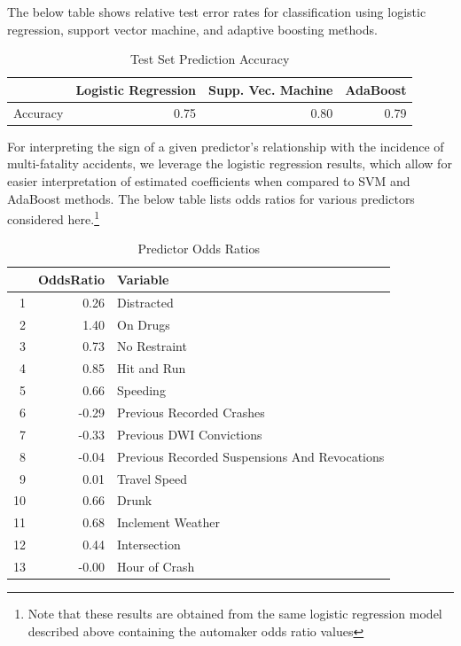 \documentclass[11pt, oneside,titlepage]{article}   	%
\begin{document}
The below table shows relative test error rates for classification using logistic regression, support vector machine, and adaptive boosting methods. \\

\begin{table}[ht]
\centering
\begin{tabular}{rrrr}
  \hline
 & Logistic Regression & Supp. Vec. Machine & AdaBoost \\ 
  \hline
Accuracy & 0.75 & 0.80 & 0.79 \\ 
   \hline
\end{tabular}
\caption{Test Set Prediction Accuracy} 
\end{table}

For interpreting the sign of a given predictor's relationship with the incidence of multi-fatality accidents, we leverage the logistic regression results, which allow for easier interpretation of estimated coefficients when compared to SVM and AdaBoost methods. The below table lists odds ratios for various predictors considered here.\footnote{Note that these results are obtained from the same logistic regression model described above containing the automaker odds ratio values}

\begin{table}[ht]
\centering
\begin{tabular}{rrl}
  \hline
 & OddsRatio & Variable \\ 
  \hline
1 & 0.26 & Distracted \\ 
  2 & 1.40 & On Drugs \\ 
  3 & 0.73 & No Restraint \\ 
  4 & 0.85 & Hit and Run \\ 
  5 & 0.66 & Speeding \\ 
  6 & -0.29 & Previous Recorded Crashes \\ 
  7 & -0.33 & Previous DWI Convictions \\ 
  8 & -0.04 & Previous Recorded Suspensions And Revocations \\ 
  9 & 0.01 & Travel Speed \\ 
  10 & 0.66 & Drunk \\ 
  11 & 0.68 & Inclement Weather \\ 
  12 & 0.44 & Intersection \\ 
  13 & -0.00 & Hour of Crash \\ 
   \hline
\end{tabular}
\caption{Predictor Odds Ratios} 
\end{table}
\end{document}
